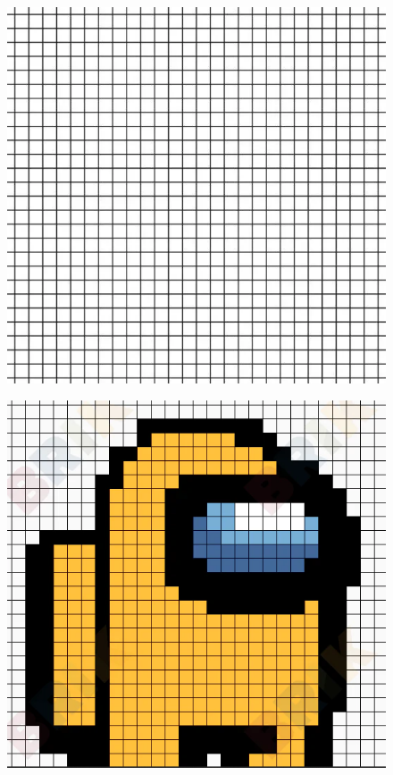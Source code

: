 \begin{minipage}[t]{0.50\textwidth}
  \begin{figure}[H]
    \centering
    \includegraphics[width=0.8\linewidth]{5x4-symetrie/grille.png}
  \end{figure}
  \end{minipage}
  \begin{minipage}[t]{0.50\textwidth}
    \begin{figure}[H]
      \centering
      \includegraphics[width=0.8\linewidth]{5x4-symetrie/pa.png}
    \end{figure}
  \end{minipage}

